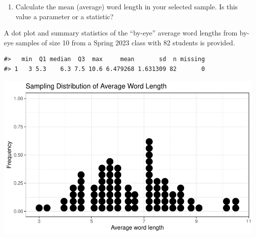 \documentclass[
]{report}
\providecommand{\tightlist}{%
  \setlength{\itemsep}{0pt}\setlength{\parskip}{0pt}}
\begin{document}
\begin{enumerate}
\def\labelenumi{\arabic{enumi}.}
\setcounter{enumi}{2}
\tightlist
\item
  Calculate the mean (average) word length in your selected sample. Is this value a parameter or a statistic?\\
  \vspace{0.3in}
\end{enumerate}

A dot plot and summary statistics of the ``by-eye'' average word lengths from by-eye samples of size 10 from a Spring 2023 class with 82 students is provided.

\begin{verbatim}
#>   min  Q1 median  Q3  max     mean       sd  n missing
#> 1   3 5.3    6.3 7.5 10.6 6.479268 1.631309 82       0
\end{verbatim}

\begin{center}\includegraphics[width=0.7\linewidth]{02-OCA01-bias_files/figure-latex/unnamed-chunk-1-1} \end{center}

\newpage
\end{document}
